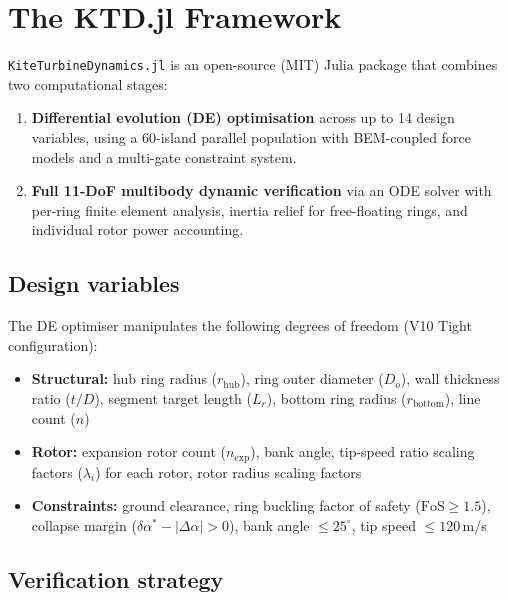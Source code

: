 \documentclass[11pt,a4paper]{article}
\begin{document}
\section{The KTD.jl Framework}

\texttt{KiteTurbineDynamics.jl} is an open-source (MIT) Julia package that combines two computational stages:

\begin{enumerate}
\item \textbf{Differential evolution (DE) optimisation} across up to 14 design variables, using a 60-island parallel population with BEM-coupled force models and a multi-gate constraint system.
\item \textbf{Full 11-DoF multibody dynamic verification} via an ODE solver with per-ring finite element analysis, inertia relief for free-floating rings, and individual rotor power accounting.
\end{enumerate}

\subsection{Design variables}

The DE optimiser manipulates the following degrees of freedom (V10 Tight configuration):

\begin{itemize}
\item \textbf{Structural:} hub ring radius ($r_{\text{hub}}$), ring outer diameter ($D_o$), wall thickness ratio ($t/D$), segment target length ($L_r$), bottom ring radius ($r_{\text{bottom}}$), line count ($n$)
\item \textbf{Rotor:} expansion rotor count ($n_{\text{exp}}$), bank angle, tip-speed ratio scaling factors ($\lambda_i$) for each rotor, rotor radius scaling factors
\item \textbf{Constraints:} ground clearance, ring buckling factor of safety ($\text{FoS} \geq 1.5$), collapse margin ($\delta\alpha^* - |\Delta\alpha| > 0$), bank angle $\leq 25^\circ$, tip speed $\leq 120$\,m/s
\end{itemize}

\subsection{Verification strategy}
\end{document}
